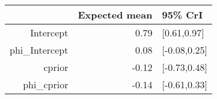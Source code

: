 \begin{tabular}{rrl}
  \hline
 & Expected mean & 95\% CrI \\ 
  \hline
Intercept & 0.79 & [0.61,0.97] \\ 
  phi\_Intercept & 0.08 & [-0.08,0.25] \\ 
  cprior & -0.12 & [-0.73,0.48] \\ 
  phi\_cprior & -0.14 & [-0.61,0.33] \\ 
   \hline
\end{tabular}

